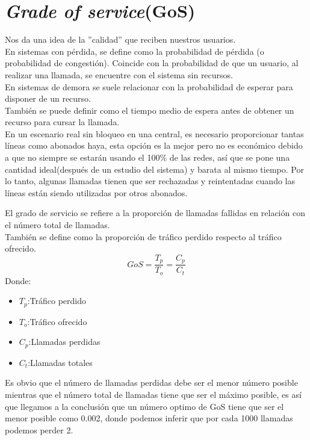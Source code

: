 \documentclass[
	12pt, %
	fleqn, %
	a4paper, %
	oneside, %
]{LegrandOrangeBook}
\begin{document}
\section{\textit{Grade of service}(GoS)}
Nos da una idea de la ''calidad'' que reciben nuestros usuarios.\\
En sistemas con pérdida, se define como la probabilidad de pérdida (o probabilidad de congestión). Coincide con la probabilidad de que un usuario, al realizar una llamada, se encuentre con el sistema sin recursos.\\
En sistemas de demora se suele relacionar con la probabilidad de esperar para disponer de un recurso.\\
También se puede definir como el tiempo medio de espera antes de obtener un recurso para cursar la llamada.\\
En un escenario real sin bloqueo en una central, es necesario proporcionar tantas líneas como abonados haya, esta opción es la mejor pero no es económico debido a que no siempre se estarán usando el 100\% de las redes, así que se pone una cantidad ideal(después de un estudio del sistema) y barata al mismo tiempo. Por lo tanto, algunas llamadas tienen que ser rechazadas y reintentadas cuando las líneas están siendo utilizadas por otros abonados.
\begin{definition}
El grado de servicio se refiere a la proporción de llamadas fallidas en relación con el número total de llamadas.\\
También se define como la proporción de tráfico perdido respecto al tráfico ofrecido.
\begin{equation}
GoS=\frac{T_p}{T_o}=\frac{C_p}{C_t}
\end{equation}
Donde:
\begin{itemize}
\item $T_p$:Tráfico perdido
\item $T_o$:Tráfico ofrecido
\item $C_p$:Llamadas perdidas
\item $C_t$:Llamadas totales
\end{itemize}
\end{definition}
\begin{remark}
Es obvio que el número de llamadas perdidas debe ser el menor número posible mientras que el número total de llamadas tiene que ser el máximo posible, es así que llegamos a la conclusión que un número optimo de GoS tiene que ser el menor posible como 0.002, donde podemos inferir que por cada 1000 llamadas podemos perder 2.
\end{remark}
\end{document}
